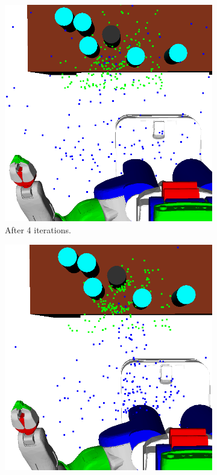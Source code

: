 \begin{figure}[t]
\begin{subfigure}[b]{0.35\linewidth}
    \includegraphics[width=\textwidth]{images/learn4.png}
    \caption{After 4 iterations.}
  \end{subfigure}
  \begin{subfigure}[b]{0.35\linewidth}
    \includegraphics[width=\textwidth]{images/learn8.png}

\end{subfigure}
\end{figure}
